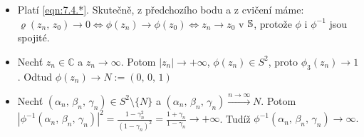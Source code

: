 \begin{properties}
\begin{itemize}
    \item Platí \cref{eqn:7.4.*}. Skutečně, z předchozího bodu a z cvičení máme: $\varrho(z_n,\,z_0)\rightarrow0\Leftrightarrow\phi(z_n)\rightarrow\phi(z_0)\Leftrightarrow z_n\rightarrow z_0$ v $\operatorname{\mathbb{S}}$, protože $\phi$ i $\phi^{-1}$ jsou spojité.
    
     \item 
     Nechť $z_n\in \mathbb{C}$ a $z_n\rightarrow \infty$. Potom $|z_n|\rightarrow+\infty$, $\phi(z_n)\in S^2$, proto  $\phi_3(z_n)\rightarrow 1$. Odtud $\phi(z_n)\rightarrow N:=(0,\,0,\,1)$
     
     \item
     Nechť $(\alpha_n,\,\beta_n,\,\gamma_n)\in S^2\setminus\{N\}$ a $(\alpha_n,\,\beta_n,\,\gamma_n)\overset{n\to\infty}{\longrightarrow} N$. Potom
     $|\phi^{-1}(\alpha_n,\,\beta_n,\,\gamma_n)|^2=\frac{1-\gamma_n^2}{(1-\gamma_n)^2}=\frac{1+\gamma_n}{1-\gamma_n}\rightarrow+\infty$. Tudíž $\phi^{-1}(\alpha_n,\,\beta_n,\,\gamma_n)\rightarrow\infty.$
\end{itemize}
\end{properties}
